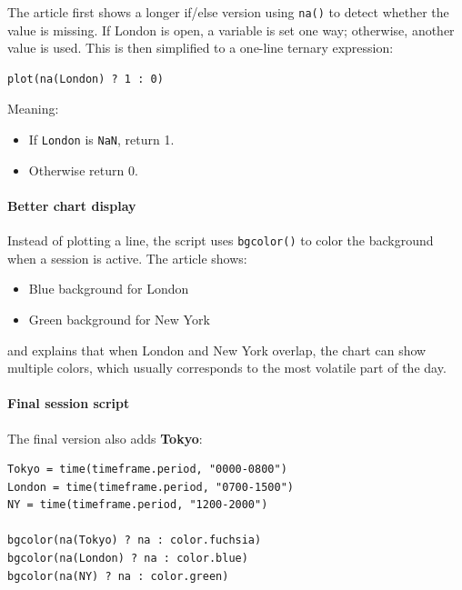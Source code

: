 \documentclass[12pt,openany]{book}
\begin{document}
The article first shows a longer if/else version using \texttt{na()} to detect whether the value is missing. If London is open, a variable is set one way; otherwise, another value is used. This is then simplified to a one-line ternary expression:

\begin{Verbatim}[breaklines=true,breakanywhere=true,fontsize=\small]
plot(na(London) ? 1 : 0)
\end{Verbatim}

Meaning:

\begin{itemize}[leftmargin=*]
    \item If \texttt{London} is \texttt{NaN}, return 1.
    \item Otherwise return 0.
\end{itemize}

\paragraph{Better chart display}

Instead of plotting a line, the script uses \texttt{bgcolor()} to color the background when a session is active. The article shows:

\begin{itemize}[leftmargin=*]
    \item Blue background for London
    \item Green background for New York
\end{itemize}

and explains that when London and New York overlap, the chart can show multiple colors, which usually corresponds to the most volatile part of the day.

\paragraph{Final session script}

The final version also adds \textbf{Tokyo}:

\begin{Verbatim}[breaklines=true,breakanywhere=true,fontsize=\small]
Tokyo = time(timeframe.period, "0000-0800")
London = time(timeframe.period, "0700-1500")
NY = time(timeframe.period, "1200-2000")

bgcolor(na(Tokyo) ? na : color.fuchsia)
bgcolor(na(London) ? na : color.blue)
bgcolor(na(NY) ? na : color.green)
\end{Verbatim}
\end{document}
